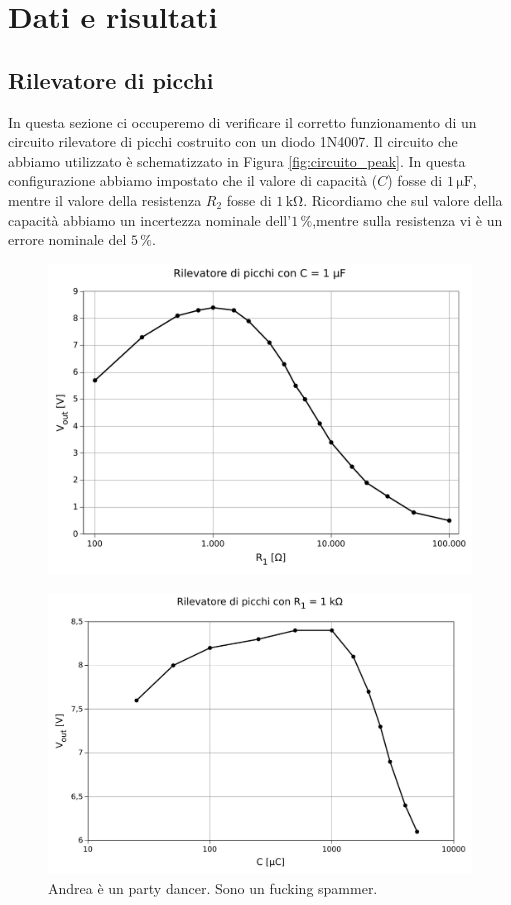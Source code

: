 \section*{Dati e risultati}

\subsection{Rilevatore di picchi}

In questa sezione ci occuperemo di verificare il corretto funzionamento di un circuito rilevatore di picchi costruito con un diodo 1N4007. Il circuito che abbiamo utilizzato è schematizzato in Figura \ref{fig:circuito_peak}.
In questa configurazione abbiamo impostato che il valore di capacità ($C$) fosse di $1\,\si{\micro\farad}$, mentre il valore della resistenza $R_2$ fosse di $1\,\si{\kilo\ohm}$. Ricordiamo che sul valore della capacità abbiamo un incertezza nominale dell'$1\,\%$,mentre sulla resistenza vi è un errore nominale del $5\,\%$. 

\begin{figure}
    \includegraphics[scale=0.7]{capacita.pdf}
    \caption{}
    \label{fig:capacita}
\end{figure}

\begin{figure}
    \includegraphics[scale=0.7]{resistenza.pdf}
    \caption{Andrea è un party dancer. Sono un fucking spammer.}
    \label{fig:resistenza}
\end{figure}

